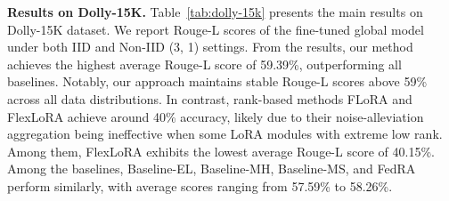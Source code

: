 \documentclass[sigconf]{acmart}
\begin{document}
\textbf{Results on Dolly-15K.}
Table~\ref{tab:dolly-15k} presents the main results on Dolly-15K dataset. We report Rouge-L scores of the fine-tuned global model under both IID and Non-IID (3, 1) settings. From the results, our method achieves the highest average Rouge-L score of 59.39\%, outperforming all baselines. Notably, our approach maintains stable Rouge-L scores above 59\% across all data distributions.
In contrast, rank-based methods FLoRA and FlexLoRA achieve around 40\% accuracy, likely due to their noise-alleviation aggregation being ineffective when some LoRA modules with extreme low rank. Among them, FlexLoRA exhibits the lowest average Rouge-L score of 40.15\%.
%
%
Among the baselines, Baseline-EL, Baseline-MH, Baseline-MS, and FedRA perform similarly, with average scores ranging from 57.59\% to 58.26\%.
\end{document}
